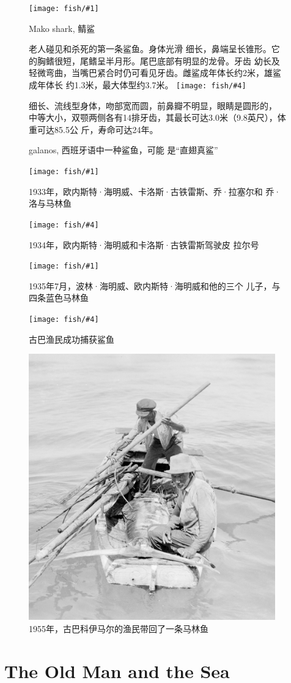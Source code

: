 \documentclass[fontset=ubuntu,zihao=-4]{ctexrep}
\newcommand{\dingphotoh}[6] {
  \begin{figure}[htbp!]
    \centering
    \texttt{[image: fish/\#1]}
    \caption{#2}\label{fig:#1}
    \raggedright\small #3
    \vfill \vspace{1cm}
    \centering
    \texttt{[image: fish/\#4]}
    \caption{#5}\label{fig:#4}
    \raggedright\small #6
  \end{figure}
  \clearpage
}
\begin{document}
\dingphotoh{Makoshark}{Mako shark, 鲭鲨}{老人碰见和杀死的第一条鲨鱼。身体光滑
  细长，鼻端呈长锥形。它的胸鳍很短，尾鳍呈半月形。尾巴底部有明显的龙骨。牙齿
  幼长及轻微弯曲，当嘴巴紧合时仍可看见牙齿。雌鲨成年体长约2米，雄鲨成年体长
  约1.3米，最大体型约3.7米。 }{galanos}{galanos, 西班牙语中一种鲨鱼，可能
  是“直翅真鲨”}{细长、流线型身体，吻部宽而圆，前鼻瓣不明显，眼睛是圆形的，
  中等大小，双颚两侧各有14排牙齿，其最长可达3.0米（9.8英尺），体重可达85.5公
  斤，寿命可达24年。}

\dingphotoh{heming1}{1933年，欧内斯特·海明威、卡洛斯·古铁雷斯、乔·拉塞尔和
  乔·洛与马林鱼}{}{heming2}{1934年，欧内斯特·海明威和卡洛斯·古铁雷斯驾驶皮
  拉尔号}{}

\dingphotoh{heming3}{1935年7月，波林·海明威、欧内斯特·海明威和他的三个
  儿子，与四条蓝色马林鱼}{}{heming4}{古巴渔民成功捕获鲨鱼}{}

\begin{figure}[ht!]
  \centering
  \includegraphics[width=0.95\textwidth]{fish/heming5.jpg} \caption{\label{fig:heming5}1955年，古巴科伊马尔的渔民带回了一条马林鱼}
\end{figure}

\chapter{The Old Man and the Sea}
\end{document}
